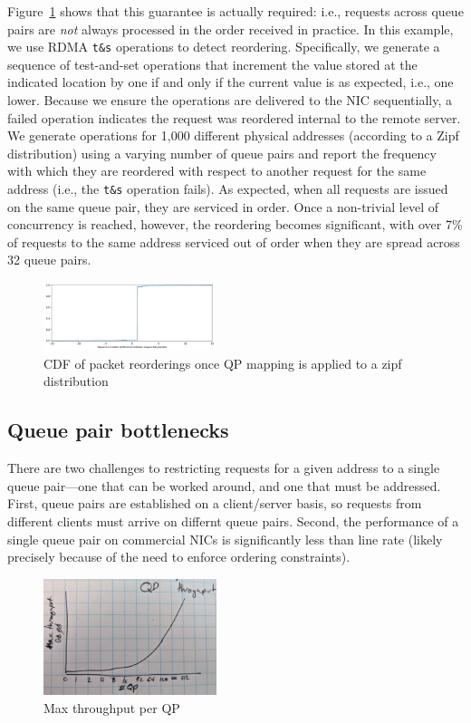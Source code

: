 Figure~\ref{fig:reorder} shows that this guarantee is actually required: i.e.,
requests across queue pairs are \emph{not} always processed in the order
received in practice.  In this example, we use RDMA \texttt{t\&s} operations to
detect reordering.  Specifically, we generate a sequence of test-and-set
operations that increment the value stored at the indicated location by one if
and only if the current value is as expected, i.e., one lower.  Because we
ensure the operations are delivered to the NIC sequentially, a failed operation
indicates the request was reordered internal to the remote server.  We generate
operations for 1,000 different physical addresses (according to a Zipf
distribution) using a varying number of queue pairs and report the frequency
with which they are reordered with respect to another request for the same
address (i.e., the \texttt{t\&s} operation fails).  As expected, when all
requests are issued on the same queue pair, they are serviced in order.  Once a
non-trivial level of concurrency is reached, however, the reordering becomes
significant, with over 7\% of requests to the same address serviced out of order
when they are spread across 32 queue pairs.

\begin{figure}[t]
    \includegraphics[width=0.45\textwidth]{fig/qp_reordering.pdf}
    \caption{CDF of packet reorderings once QP mapping is applied to a zipf distribution}
    \label{fig:reorder}
\end{figure}

\subsection{Queue pair bottlenecks}

 There are two challenges to restricting requests for a given address
 to a single queue pair---one that can be worked around, and one that
 must be addressed.  First, queue pairs are established on a
 client/server basis, so requests from different clients must arrive
 on differnt queue pairs.  Second, the performance of a single queue
 pair on commercial NICs is significantly less than line rate (likely
 precisely because of the need to enforce ordering constraints).

\begin{figure}[t]
    \includegraphics[width=0.45\textwidth]{fig/qp_bottleneck.jpg}
    \caption{Max throughput per QP }
    \label{fig:qp_bottleneck}
\end{figure}

 





